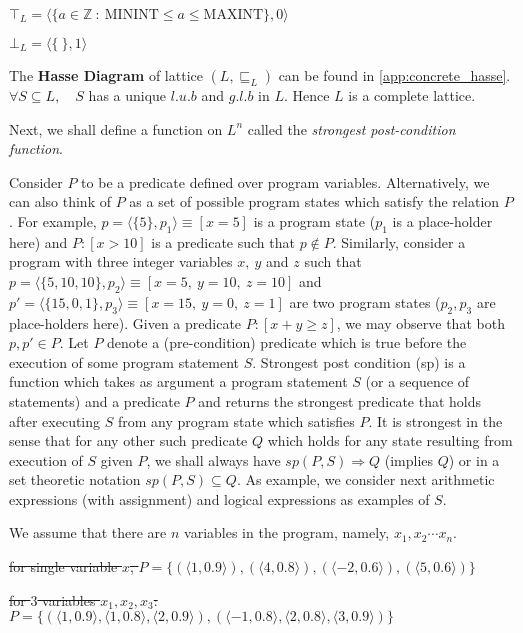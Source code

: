 \documentclass[final,3p, review, times]{util/elsarticle}
\begin{document}
$\top_L=\langle\{a\in\mathbb{Z}\ :\ \mathrm{MININT}\leq a\leq\mathrm{MAXINT}\}, 0\rangle$

$\bot_L=\langle\{\ \}, 1\rangle$

The \textbf{Hasse Diagram} of lattice $(L,\sqsubseteq_L)$ can be found in \ref{app:concrete_hasse}. $\forall S\subseteq L,\quad S$ has a unique $l.u.b$ and $g.l.b$ in $L$. Hence $L$ is a complete lattice.

Next, we shall define a function on $L^n$ called the \textit{strongest post-condition function}\cite{lara13}.

Consider $P$ to be a predicate defined over program variables. Alternatively, we can also think of $P$ as a set of possible program states which satisfy the relation $P$. For example, $p=\langle\{5\},p_1\rangle\equiv[x=5]$ is a program state ($p_1$ is a place-holder here) and $P:[x>10]$ is a predicate such that $p\notin P$. Similarly, consider a program with three integer variables $x,\ y$ and $z$ such that $p=\langle\{5,10,10\},p_2\rangle\equiv[x=5,\ y=10,\ z=10]$ and $p'=\langle\{15,0,1\},p_3\rangle\equiv[x=15,\ y=0,\ z=1]$ are two program states ($p_2,p_3$ are place-holders here). Given a predicate $P:[x+y\geq z]$, we may observe that both $p,p'\in P$. Let $P$ denote a (pre-condition) predicate which is true before the execution of some program statement $S$. Strongest post condition (sp) is a function which takes as argument a program statement $S$ (or a sequence of statements) and a predicate $P$ and returns the strongest predicate that holds after executing $S$ from any program state which satisfies $P$. It is strongest in the sense that for any other such predicate $Q$ which holds for any state resulting from execution of $S$ given $P$, we shall always have $sp(P,S)\Rightarrow Q$ (implies $Q$) or in a set theoretic notation $sp(P,S)\subseteq Q$. As example, we consider next arithmetic expressions (with assignment) and logical expressions as examples of $S$.

We assume that there are $n$ variables in the program, namely, $x_1,x_2\cdots x_n$.

\st{for single variable $x$, $P=\{(\langle1,0.9\rangle),(\langle4,0.8\rangle),(\langle-2,0.6\rangle),(\langle5,0.6\rangle)\}$}

\st{for $3$ variables $x_1,x_2,x_3$: $P=\{(\langle1,0.9\rangle,\langle1,0.8\rangle,\langle2,0.9\rangle),(\langle-1,0.8\rangle,\langle2,0.8\rangle,\langle3,0.9\rangle)\}$}
\end{document}
